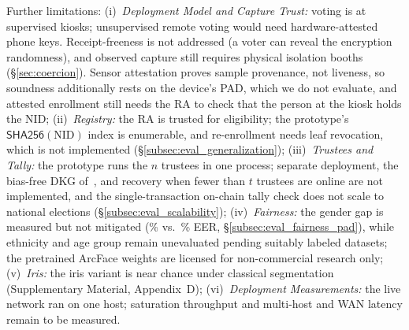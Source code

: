 \documentclass[10pt,letterpaper,journal]{IEEEtran}
\begin{document}
Further limitations: (i)~\emph{Deployment Model and Capture Trust:} voting is at supervised kiosks; unsupervised remote voting would need hardware-attested phone keys. Receipt-freeness is not addressed (a voter can reveal the encryption randomness), and observed capture still requires physical isolation booths (\S\ref{sec:coercion}). Sensor attestation proves sample provenance, not liveness, so soundness additionally rests on the device's PAD, which we do not evaluate, and attested enrollment still needs the RA to check that the person at the kiosk holds the NID; (ii)~\emph{Registry:} the RA is trusted for eligibility; the prototype's $\mathsf{SHA256}(\text{NID})$ index is enumerable, and re-enrollment needs leaf revocation, which is not implemented (\S\ref{subsec:eval_generalization}); (iii)~\emph{Trustees and Tally:} the prototype runs the $n$ trustees in one process; separate deployment, the bias-free DKG of~\cite{Gennaro2007}, and recovery when fewer than $t$ trustees are online are not implemented, and the single-transaction on-chain tally check does not scale to national elections (\S\ref{subsec:eval_scalability}); (iv)~\emph{Fairness:} the gender gap is measured but not mitigated (\nMaleEer\% vs.\ \nFemaleEer\% EER, \S\ref{subsec:eval_fairness_pad}), while ethnicity and age group remain unevaluated pending suitably labeled datasets; the pretrained ArcFace weights are licensed for non-commercial research only; (v)~\emph{Iris:} the iris variant is near chance under classical segmentation (Supplementary Material, Appendix~D); (vi)~\emph{Deployment Measurements:} the live network ran on one host; saturation throughput and multi-host and WAN latency remain to be measured.
\end{document}
